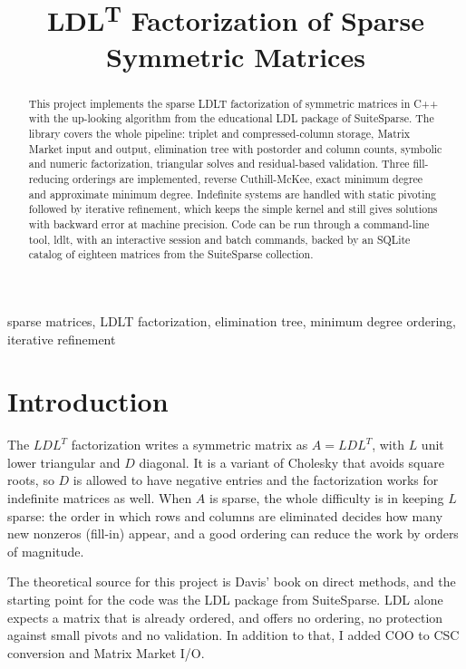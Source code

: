 \documentclass[conference]{IEEEtran}
\begin{document}
\title{LDL\textsuperscript{T} Factorization of Sparse Symmetric Matrices}

\author{
}

\maketitle

\begin{abstract}
This project implements the sparse LDLT factorization of symmetric matrices in C++ with the up-looking algorithm from the educational LDL package of SuiteSparse. The library covers the whole pipeline: triplet and compressed-column storage, Matrix Market input and output, elimination tree with postorder and column counts, symbolic and numeric factorization, triangular solves and residual-based validation. Three fill-reducing orderings are implemented, reverse Cuthill-McKee, exact minimum degree and approximate minimum degree. Indefinite systems are handled with static pivoting followed by iterative refinement, which keeps the simple kernel and still gives solutions with backward error at machine precision. Code can be run through a command-line tool, ldlt, with an interactive session and batch commands, backed by an SQLite catalog of eighteen matrices from the SuiteSparse collection.
\end{abstract}

\begin{IEEEkeywords}
sparse matrices, LDLT factorization, elimination tree, minimum degree ordering, iterative refinement
\end{IEEEkeywords}

\section{Introduction}
The $LDL^T$ factorization writes a symmetric matrix as $A = LDL^T$, with $L$ unit lower triangular and $D$ diagonal. It is a variant of Cholesky that avoids square roots, so $D$ is allowed to have negative entries and the factorization works for indefinite matrices as well. When $A$ is sparse, the whole difficulty is in keeping $L$ sparse: the order in which rows and columns are eliminated decides how many new nonzeros (fill-in) appear, and a good ordering can reduce the work by orders of magnitude.

The theoretical source for this project is Davis' book on direct methods\cite{b1}, and the starting point for the code was the LDL package\cite{b2} from SuiteSparse. LDL alone expects a matrix that is already ordered, and offers no ordering, no protection against small pivots and no validation. In addition to that, I added COO to CSC conversion and Matrix Market I/O.
\end{document}
